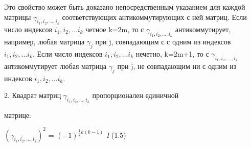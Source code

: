 \documentclass{article}
\begin{document}
Это свойство может быть доказано непосредственным указанием для каждой матрицы $\gamma_{i_1,i_2,\dots, i_k}$ соответствующих антикоммутирующих с ней матриц. Если число индексов $i_1,i_2,\dots i_k$ четное k=2m, то с $\gamma_{i_1,i_2,\dots, i_k}$ антикоммутирует, например, любая матрица $\gamma_j$ при j, совпадающим с с одним из индексов $i_1,i_2,\dots i_k$. Если число индексов $i_1,i_2,\dots i_k$ нечетно, k=2m+1, то с $\gamma_{i_1,i_2,\dots, i_k}$ антикоммутирует любая матрица $\gamma_j$ при j, не совпадающим ни с одним из индексов $i_1,i_2,\dots i_k$.\par
2. Квадрат матриц $\gamma_{i_1,i_2,\dots, i_k}$ пропорционален единичной\par
матрице:
\begin{center}
$(\gamma_{i_1,i_2,\dots, i_k})^2$ = $(-1)^{{\frac{1}{2}}k(k-1)}$ \textsl{I}    (1.5)\par
\end{center}
\end{document}
